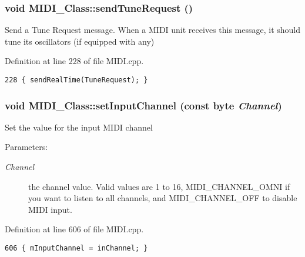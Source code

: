 \hypertarget{class_m_i_d_i___class_9d9a51ca4a888c7c4c0d91a9e678c751}{
\subsubsection[{sendTuneRequest}]{\setlength{\rightskip}{0pt plus 5cm}void MIDI\_\-Class::sendTuneRequest ()}}
\label{class_m_i_d_i___class_9d9a51ca4a888c7c4c0d91a9e678c751}


Send a Tune Request message. When a MIDI unit receives this message, it should tune its oscillators (if equipped with any) 

Definition at line 228 of file MIDI.cpp.

\begin{Code}\begin{verbatim}228 { sendRealTime(TuneRequest); }
\end{verbatim}
\end{Code}


\hypertarget{class_m_i_d_i___class_35a66d47ba598c7ebbee7fbf654dafe8}{
\subsubsection[{setInputChannel}]{\setlength{\rightskip}{0pt plus 5cm}void MIDI\_\-Class::setInputChannel (const {\bf byte} {\em Channel})}}
\label{class_m_i_d_i___class_35a66d47ba598c7ebbee7fbf654dafe8}


Set the value for the input MIDI channel \begin{Desc}
\item[Parameters:]
\begin{description}
\item[{\em Channel}]the channel value. Valid values are 1 to 16, MIDI\_\-CHANNEL\_\-OMNI if you want to listen to all channels, and MIDI\_\-CHANNEL\_\-OFF to disable MIDI input. \end{description}
\end{Desc}


Definition at line 606 of file MIDI.cpp.

\begin{Code}\begin{verbatim}606 { mInputChannel = inChannel; }
\end{verbatim}
\end{Code}


